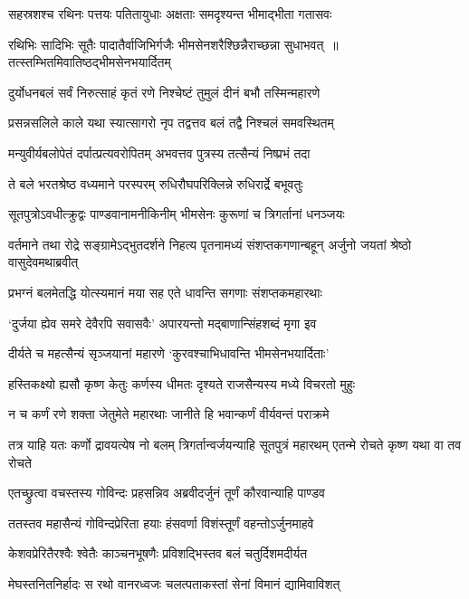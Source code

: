 \twolineshloka
{सहस्रशश्च रथिनः पत्तयः पतितायुधाः}
{अक्षताः समदृश्यन्त भीमाद्भीता गतासवः}


\threelineshloka
{रथिभिः सादिभिः सूतैः पादातैर्वाजिभिर्गजैः}
{भीमसेनशरैश्छिन्नैराच्छन्ना सुधाभवत् ॥तत्स्तम्भितमिवातिष्ठद्भीमसेनभयार्दितम्}
{}


\twolineshloka
{दुर्योधनबलं सर्वं निरुत्साहं कृतं रणे}
{निश्चेष्टं तुमुलं दीनं बभौ तस्मिन्महारणे}


\twolineshloka
{प्रसन्नसलिले काले यथा स्यात्सागरो नृप}
{तद्वत्तव बलं तद्वै निश्चलं समवस्थितम्}


\twolineshloka
{मन्युवीर्यबलोपेतं दर्पात्प्रत्यवरोपितम्}
{अभवत्तव पुत्रस्य तत्सैन्यं निष्प्रभं तदा}


\twolineshloka
{ते बले भरतश्रेष्ठ वध्यमाने परस्परम्}
{रुधिरौघपरिक्लिन्ने रुधिरार्द्रे बभूवतुः}


\twolineshloka
{सूतपुत्रोऽवधीत्क्रुद्वः पाण्डवानामनीकिनीम्}
{भीमसेनः कुरूणां च त्रिगर्तानां धनञ्जयः}


\threelineshloka
{वर्तमाने तथा रोद्रे सङ्ग्रामेऽद्भुतदर्शने}
{निहत्य पृतनामध्यं संशप्तकगणान्बहून्}
{अर्जुनो जयतां श्रेष्ठो वासुदेवमथाब्रवीत्}


\twolineshloka
{प्रभग्नं बलमेतद्धि योत्स्यमानं मया सह}
{एते धावन्ति सगणाः संशप्तकमहारथाः}


\twolineshloka
{`दुर्जया ह्येव समरे देवैरपि सवासवैः'}
{अपारयन्तो मद्बाणान्सिंहशब्दं मृगा इव}


\twolineshloka
{दीर्यते च महत्सैन्यं सृञ्जयानां महारणे}
{`कुरवश्चाभिधावन्ति भीमसेनभयार्दिताः'}


\twolineshloka
{हस्तिकक्ष्यो ह्यसौ कृष्ण केतुः कर्णस्य धीमतः}
{दृश्यते राजसैन्यस्य मध्ये विचरतो मुहुः}


\twolineshloka
{न च कर्णं रणे शक्ता जेतुमेते महारथाः}
{जानीते हि भवान्कर्णं वीर्यवन्तं पराक्रमे}


\threelineshloka
{तत्र याहि यतः कर्णो द्रावयत्येष नो बलम्}
{त्रिगर्तान्वर्जयन्याहि सूतपुत्रं महारथम्}
{एतन्मे रोचते कृष्ण यथा वा तव रोचते}


\twolineshloka
{एतच्छ्रुत्वा वचस्तस्य गोविन्दः प्रहसन्निव}
{अब्रवीदर्जुनं तूर्णं कौरवान्याहि पाण्डव}


\twolineshloka
{ततस्तव महासैन्यं गोविन्दप्रेरिता हयाः}
{हंसवर्णा विशंस्तूर्णं वहन्तोऽर्जुनमाहवे}


\twolineshloka
{केशवप्रेरितैरश्वैः श्वेतैः काञ्चनभूषणैः}
{प्रविशद्भिस्तव बलं चतुर्दिशमदीर्यत}


\twolineshloka
{मेघस्तनितनिर्हादः स रथो वानरध्वजः}
{चलत्पताकस्तां सेनां विमानं द्यामिवाविशत्}


